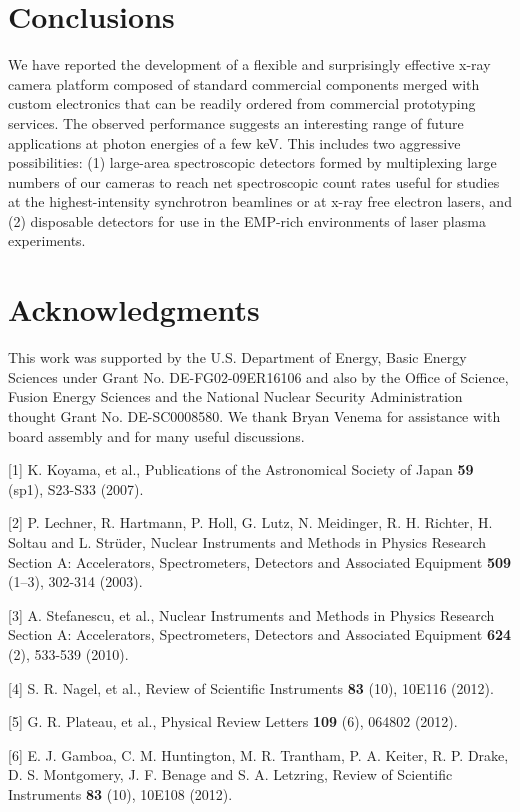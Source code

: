 \section{Conclusions}
We have reported the development of a flexible and
surprisingly effective x-ray camera platform composed of standard
commercial components merged with custom electronics that can be readily
ordered from commercial prototyping services. The observed performance
suggests an interesting range of future applications at photon energies
of a few keV. This includes two aggressive possibilities: (1) large-area
spectroscopic detectors formed by multiplexing large numbers of our
cameras to reach net spectroscopic count rates useful for studies at the
highest-intensity synchrotron beamlines or at x-ray free electron
lasers, and (2) disposable detectors for use in the EMP-rich
environments of laser plasma experiments.

\section*{Acknowledgments}
This work was supported by the U.S.
Department of Energy, Basic Energy Sciences under Grant No.
DE-FG02-09ER16106 and also by the Office of Science, Fusion Energy
Sciences and the National Nuclear Security Administration thought Grant
No. DE-SC0008580. We thank Bryan Venema for assistance with board
assembly and for many useful discussions.


{[}1{]} K. Koyama, et al., Publications of the
Astronomical Society of Japan \textbf{59} (sp1), S23-S33 (2007).

{[}2{]} P. Lechner, R. Hartmann, P. Holl, G.
Lutz, N. Meidinger, R. H. Richter, H. Soltau and L. Strüder, Nuclear
Instruments and Methods in Physics Research Section A: Accelerators,
Spectrometers, Detectors and Associated Equipment \textbf{509} (1--3),
302-314 (2003).

{[}3{]} A. Stefanescu, et al., Nuclear
Instruments and Methods in Physics Research Section A: Accelerators,
Spectrometers, Detectors and Associated Equipment \textbf{624} (2),
533-539 (2010).

{[}4{]} S. R. Nagel, et al., Review of
Scientific Instruments \textbf{83} (10), 10E116 (2012).

{[}5{]} G. R. Plateau, et al., Physical Review
Letters \textbf{109} (6), 064802 (2012).

{[}6{]} E. J. Gamboa, C. M. Huntington, M. R.
Trantham, P. A. Keiter, R. P. Drake, D. S. Montgomery, J. F. Benage and
S. A. Letzring, Review of Scientific Instruments \textbf{83} (10),
10E108 (2012).

